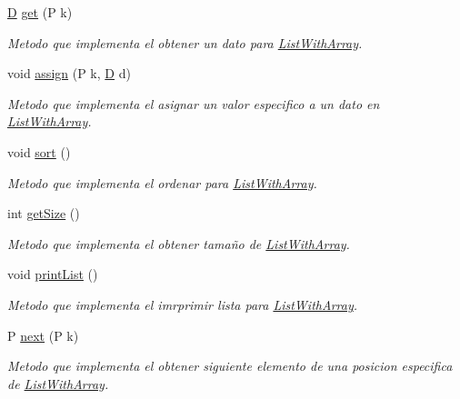 \begin{DoxyCompactItemize}
\hyperlink{main_8cpp_af316c33cc298530f245e8b55330e86b5}{D} \hyperlink{class_list_with_array_a20cfc82811967bc2a77a6e43b9cebb46}{get} (P k)
\begin{DoxyCompactList}\small\item\em Metodo que implementa el obtener un dato para \hyperlink{class_list_with_array}{List\+With\+Array}. \end{DoxyCompactList}\item 
void \hyperlink{class_list_with_array_a9dd1fd2337c6c8d437de71aae0e816c8}{assign} (P k, \hyperlink{main_8cpp_af316c33cc298530f245e8b55330e86b5}{D} d)
\begin{DoxyCompactList}\small\item\em Metodo que implementa el asignar un valor especifico a un dato en \hyperlink{class_list_with_array}{List\+With\+Array}. \end{DoxyCompactList}\item 
void \hyperlink{class_list_with_array_a1a0ec4ab4a8fcb1a20568445ad892c9a}{sort} ()
\begin{DoxyCompactList}\small\item\em Metodo que implementa el ordenar para \hyperlink{class_list_with_array}{List\+With\+Array}. \end{DoxyCompactList}\item 
int \hyperlink{class_list_with_array_ae7a071bcdde9ddbf4c40a716f5a09434}{get\+Size} ()
\begin{DoxyCompactList}\small\item\em Metodo que implementa el obtener tamaño de \hyperlink{class_list_with_array}{List\+With\+Array}. \end{DoxyCompactList}\item 
void \hyperlink{class_list_with_array_a515ea38cb40ba7b0c9df98825b2dd270}{print\+List} ()
\begin{DoxyCompactList}\small\item\em Metodo que implementa el imrprimir lista para \hyperlink{class_list_with_array}{List\+With\+Array}. \end{DoxyCompactList}\item 
P \hyperlink{class_list_with_array_a125811011abb77c1b11e5150f4524fb1}{next} (P k)
\begin{DoxyCompactList}\small\item\em Metodo que implementa el obtener siguiente elemento de una posicion especifica de \hyperlink{class_list_with_array}{List\+With\+Array}. \end{DoxyCompactList}\item 

\end{DoxyCompactItemize}
